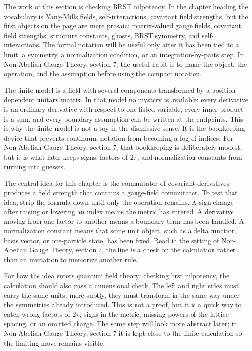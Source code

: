 The work of this section is checking BRST nilpotency.  In the chapter heading the vocabulary is Yang-Mills fields, self-interactions, covariant field strengths, but the first objects on the page are more prosaic: matrix-valued gauge fields, covariant field strengths, structure constants, ghosts, BRST symmetry, and self-interactions.  The formal notation will be useful only after it has been tied to a limit, a symmetry, a normalization condition, or an integration-by-parts step.  In Non-Abelian Gauge Theory, section 7, the useful habit is to name the object, the operation, and the assumption before using the compact notation.

The finite model is a field with several components transformed by a position-dependent unitary matrix.  In that model no mystery is available: every derivative is an ordinary derivative with respect to one listed variable, every inner product is a sum, and every boundary assumption can be written at the endpoints.  This is why the finite model is not a toy in the dismissive sense.  It is the bookkeeping device that prevents continuum notation from becoming a fog of indices.  For Non-Abelian Gauge Theory, section 7, that bookkeeping is deliberately modest, but it is what later keeps signs, factors of \(2\pi\), and normalization constants from turning into guesses.

The central idea for this chapter is the commutator of covariant derivatives produces a field strength that contains a gauge-field commutator.  To test that idea, strip the formula down until only the operation remains.  A sign change after raising or lowering an index means the metric has entered.  A derivative moving from one factor to another means a boundary term has been handled.  A normalization constant means that some unit object, such as a delta function, basis vector, or one-particle state, has been fixed.  Read in the setting of Non-Abelian Gauge Theory, section 7, the line is a check on the calculation rather than an invitation to memorize another rule.

For how the idea enters quantum field theory: checking brst nilpotency, the calculation should also pass a dimensional check.  The left and right sides must carry the same units; more subtly, they must transform in the same way under the symmetries already introduced.  This is not a proof, but it is a quick way to catch wrong factors of \(2\pi\), signs in the metric, missing powers of the lattice spacing, or an omitted charge.  The same step will look more abstract later; in Non-Abelian Gauge Theory, section 7 it is kept close to the finite calculation so the limiting move remains visible.

